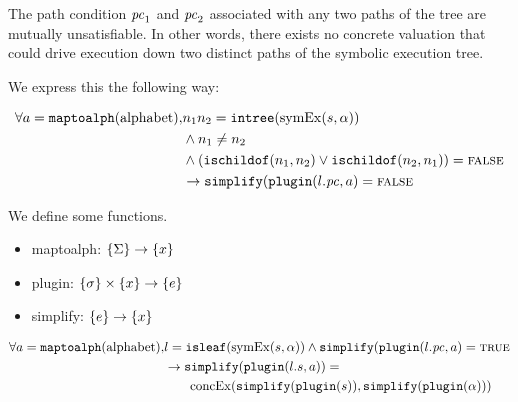\begin{property}
  \label{prop:kingunique}
The path condition $\mathit{pc}_1$ and $\mathit{pc}_2$ associated with any two paths of the
tree are mutually unsatisfiable. In other words, there exists no concrete
valuation that could drive execution down two distinct paths of the symbolic
execution tree.

We express this the following way: 

\begin{align*}
\forall a = \mathtt{maptoalph}(\mathrm{alphabet}), &  n_1 n_2 =
\mathtt{intree}(\mathrm{symEx}(s,\alpha)) \\
& \wedge
n_1 \neq n_2 \\
&  \wedge
(\mathtt{ischildof}(n_1, n_2) \vee  \mathtt{ischildof}(n_2, n_1))= \mathtt{\textsc{false}} \\
&\rightarrow \mathtt{simplify}(\mathtt{plugin}(l.\mathit{pc},a) = \mathtt{\textsc{false}}
\end{align*}
\end{property}

\begin{property}[Commutativity]

  We define some functions.
  \begin{itemize}
  \item maptoalph: $\{\Sigma\} \rightarrow \{x\}$
  \item plugin: $\{\sigma\} \times \{x\} \rightarrow
    \{e\}$
  \item simplify: $\{e\} \rightarrow \{x\}$
  \end{itemize}




\begin{align*}
\forall a = \mathtt{maptoalph}(\mathrm{alphabet}), & l =
\mathtt{isleaf}(\mathrm{symEx}(s,\alpha)) \wedge
\mathtt{simplify}(\mathtt{plugin}(l.\mathit{pc},a) = \mathtt{\textsc{true}} \\
&\rightarrow \mathtt{simplify}(\mathtt{plugin}(l.s,a)) = \\
&\qquad\mathrm{concEx}(\mathtt{simplify}(\mathtt{plugin}(s)),\mathtt{simplify}(\mathtt{plugin}(\alpha)))
\end{align*}
\end{property}




